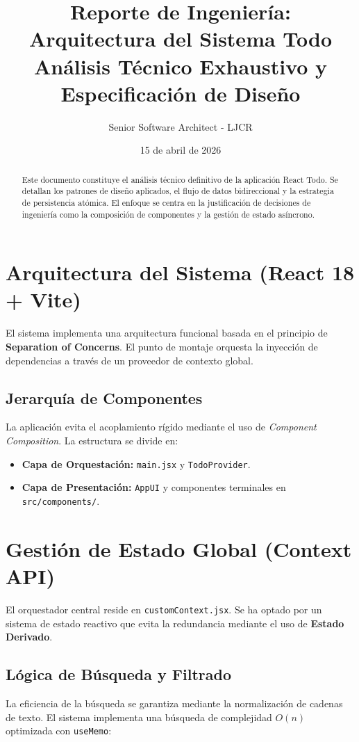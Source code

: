 \documentclass[12pt,a4paper]{report}
\title{\textbf{Reporte de Ingeniería: Arquitectura del Sistema Todo}\\ \Large{Análisis Técnico Exhaustivo y Especificación de Diseño}}
\author{Senior Software Architect - LJCR}
\date{15 de abril de 2026}
\begin{document}
\maketitle

\begin{abstract}
Este documento constituye el análisis técnico definitivo de la aplicación React Todo. Se detallan los patrones de diseño aplicados, el flujo de datos bidireccional y la estrategia de persistencia atómica. El enfoque se centra en la justificación de decisiones de ingeniería como la composición de componentes y la gestión de estado asíncrono.
\end{abstract}

\tableofcontents

\chapter{Arquitectura del Sistema (React 18 + Vite)}

El sistema implementa una arquitectura funcional basada en el principio de \textbf{Separation of Concerns}. El punto de montaje orquesta la inyección de dependencias a través de un proveedor de contexto global.

\section{Jerarquía de Componentes}
La aplicación evita el acoplamiento rígido mediante el uso de \textit{Component Composition}. La estructura se divide en:
\begin{itemize}
    \item \textbf{Capa de Orquestación:} \texttt{main.jsx} y \texttt{TodoProvider}.
    \item \textbf{Capa de Presentación:} \texttt{AppUI} y componentes terminales en \texttt{src/components/}.
\end{itemize}

\chapter{Gestión de Estado Global (Context API)}

El orquestador central reside en \texttt{customContext.jsx}. Se ha optado por un sistema de estado reactivo que evita la redundancia mediante el uso de \textbf{Estado Derivado}.

\section{Lógica de Búsqueda y Filtrado}
La eficiencia de la búsqueda se garantiza mediante la normalización de cadenas de texto. El sistema implementa una búsqueda de complejidad $O(n)$ optimizada con \texttt{useMemo}:
\end{document}
